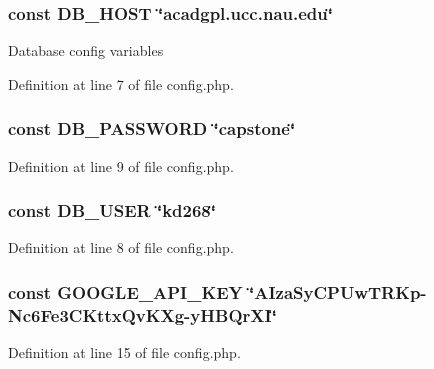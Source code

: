 \hypertarget{config_8php_a293363d7988627f671958e2d908c202a}{
\subsubsection[{D\-B\-\_\-\-H\-O\-S\-T}]{\setlength{\rightskip}{0pt plus 5cm}const D\-B\-\_\-\-H\-O\-S\-T \char`\"{}acadgpl.\-ucc.\-nau.\-edu\char`\"{}}}\label{config_8php_a293363d7988627f671958e2d908c202a}
Database config variables 

Definition at line 7 of file config.\-php.

\hypertarget{config_8php_a4dca144fafcc7bd3f71cb5778afcdd13}{
\subsubsection[{D\-B\-\_\-\-P\-A\-S\-S\-W\-O\-R\-D}]{\setlength{\rightskip}{0pt plus 5cm}const D\-B\-\_\-\-P\-A\-S\-S\-W\-O\-R\-D \char`\"{}capstone\char`\"{}}}\label{config_8php_a4dca144fafcc7bd3f71cb5778afcdd13}


Definition at line 9 of file config.\-php.

\hypertarget{config_8php_a1d1d99f8e08f387d84fe9848f3357156}{
\subsubsection[{D\-B\-\_\-\-U\-S\-E\-R}]{\setlength{\rightskip}{0pt plus 5cm}const D\-B\-\_\-\-U\-S\-E\-R \char`\"{}kd268\char`\"{}}}\label{config_8php_a1d1d99f8e08f387d84fe9848f3357156}


Definition at line 8 of file config.\-php.

\hypertarget{config_8php_a790fe630024963ffd7343444ad986bc7}{
\subsubsection[{G\-O\-O\-G\-L\-E\-\_\-\-A\-P\-I\-\_\-\-K\-E\-Y}]{\setlength{\rightskip}{0pt plus 5cm}const G\-O\-O\-G\-L\-E\-\_\-\-A\-P\-I\-\_\-\-K\-E\-Y \char`\"{}A\-Iza\-Sy\-C\-P\-Uw\-T\-R\-Kp-\/Nc6\-Fe3\-C\-Kttx\-Qv\-K\-Xg-\/y\-H\-B\-Qr\-X\-I\char`\"{}}}\label{config_8php_a790fe630024963ffd7343444ad986bc7}


Definition at line 15 of file config.\-php.

